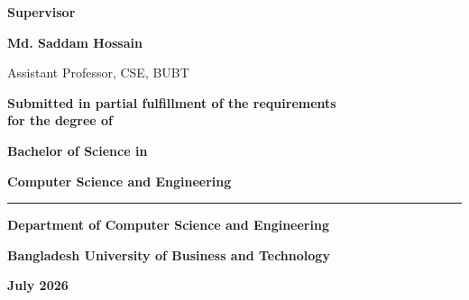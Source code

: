 \documentclass[12pt,a4paper]{report}
\begin{document}
\begin{titlepage}
    \vspace{1.0cm}
    
    {\large \textbf{Supervisor}}\par
    \vspace{0.2cm}
    {\large \textbf{Md. Saddam Hossain}}\par
    {\normalsize Assistant Professor, CSE, BUBT}\par

    \vfill

    {\normalsize \textbf{Submitted in partial fulfillment of the requirements \\ for the degree of}}\par
    \vspace{0.2cm}
    {\large \textbf{Bachelor of Science in}}\par
    {\large \textbf{Computer Science and Engineering}}\par

    \vspace{0.8cm}
    
    {\color{primary}\rule{0.6\textwidth}{1pt}}\par
    \vspace{0.4cm}
    {\large \textbf{Department of Computer Science and Engineering}}\par
    \vspace{0.2cm}
    {\large \textbf{Bangladesh University of Business and Technology}}\par
    \vspace{0.2cm}
    {\normalsize \textbf{July 2026}}\par
    
    \vspace*{0.2cm}
\end{titlepage}
\end{document}
